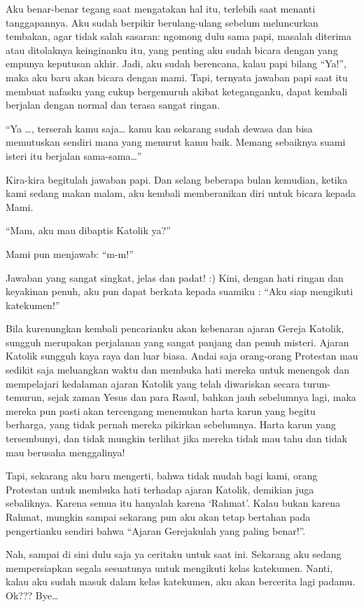 Aku benar-benar tegang saat mengatakan hal itu, terlebih saat menanti tanggapannya. Aku sudah berpikir berulang-ulang sebelum meluncurkan tembakan, agar tidak salah sasaran: ngomong dulu sama papi, masalah diterima atau ditolaknya keinginanku itu, yang penting aku sudah bicara dengan yang empunya keputusan akhir. Jadi, aku sudah berencana, kalau papi bilang “Ya!”, maka aku baru akan bicara dengan mami.
Tapi, ternyata jawaban papi saat itu membuat nafasku yang cukup bergemuruh akibat keteganganku, dapat kembali berjalan dengan normal dan terasa sangat ringan.

“Ya \ldots , terserah kamu saja… kamu kan sekarang sudah dewasa dan bisa memutuskan sendiri mana yang menurut kamu baik. Memang sebaiknya suami isteri itu berjalan sama-sama…”

Kira-kira begitulah jawaban papi.
Dan selang beberapa bulan kemudian, ketika kami sedang makan malam, aku kembali memberanikan diri untuk bicara kepada Mami.

“Mam, aku mau dibaptis Katolik ya?”

Mami pun menjawab: “m-m!”

Jawaban yang sangat singkat, jelas dan padat! :)
Kini, dengan hati ringan dan keyakinan penuh, aku pun dapat berkata kepada suamiku : “Aku siap mengikuti katekumen!”

Bila kurenungkan kembali pencarianku akan kebenaran ajaran
Gereja Katolik, sungguh merupakan perjalanan yang sangat panjang dan penuh misteri. Ajaran Katolik sungguh kaya raya dan luar biasa. Andai saja orang-orang Protestan mau sedikit saja meluangkan waktu dan membuka hati mereka untuk menengok dan mempelajari kedalaman ajaran Katolik yang telah diwariskan secara turun-temurun, sejak zaman Yesus dan para Rasul, bahkan jauh sebelumnya lagi, maka mereka pun pasti akan tercengang menemukan harta karun yang begitu berharga, yang tidak pernah mereka pikirkan sebelumnya. Harta karun yang tersembunyi, dan tidak mungkin terlihat jika mereka tidak mau tahu dan tidak mau berusaha menggalinya!

Tapi, sekarang aku baru mengerti, bahwa tidak mudah bagi kami, orang Protestan untuk membuka hati terhadap ajaran Katolik, demikian juga sebaliknya. Karena semua itu hanyalah karena ‘Rahmat’. Kalau bukan karena Rahmat, mungkin sampai sekarang pun aku akan tetap bertahan pada pengertianku sendiri bahwa “Ajaran Gerejakulah yang paling benar!”.

Nah, sampai di sini dulu saja ya ceritaku untuk saat ini. Sekarang aku sedang mempersiapkan segala sesuatunya untuk mengikuti kelas katekumen. Nanti, kalau aku sudah masuk dalam kelas katekumen, aku akan bercerita lagi padamu.
Ok???
Bye…
